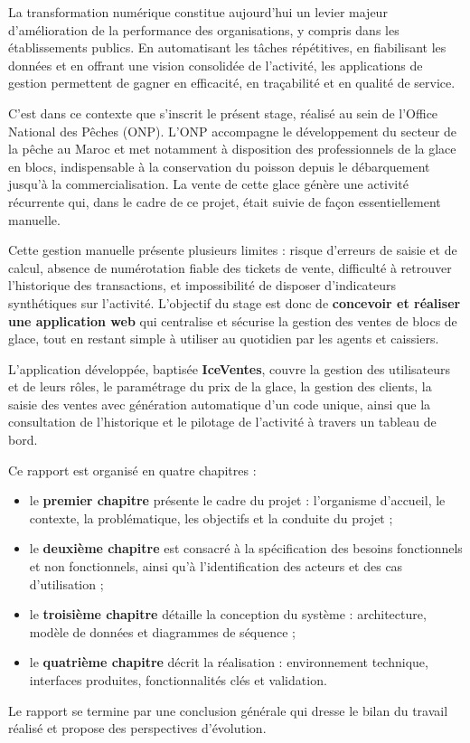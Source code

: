 La transformation numérique constitue aujourd'hui un levier majeur d'amélioration de la performance des organisations, y compris dans les établissements publics. En automatisant les tâches répétitives, en fiabilisant les données et en offrant une vision consolidée de l'activité, les applications de gestion permettent de gagner en efficacité, en traçabilité et en qualité de service.

C'est dans ce contexte que s'inscrit le présent stage, réalisé au sein de l'Office National des Pêches (ONP). L'ONP accompagne le développement du secteur de la pêche au Maroc et met notamment à disposition des professionnels de la glace en blocs, indispensable à la conservation du poisson depuis le débarquement jusqu'à la commercialisation. La vente de cette glace génère une activité récurrente qui, dans le cadre de ce projet, était suivie de façon essentiellement manuelle.

Cette gestion manuelle présente plusieurs limites : risque d'erreurs de saisie et de calcul, absence de numérotation fiable des tickets de vente, difficulté à retrouver l'historique des transactions, et impossibilité de disposer d'indicateurs synthétiques sur l'activité. L'objectif du stage est donc de \textbf{concevoir et réaliser une application web} qui centralise et sécurise la gestion des ventes de blocs de glace, tout en restant simple à utiliser au quotidien par les agents et caissiers.

L'application développée, baptisée \textbf{IceVentes}, couvre la gestion des utilisateurs et de leurs rôles, le paramétrage du prix de la glace, la gestion des clients, la saisie des ventes avec génération automatique d'un code unique, ainsi que la consultation de l'historique et le pilotage de l'activité à travers un tableau de bord.

Ce rapport est organisé en quatre chapitres :

\begin{itemize}
  \item le \textbf{premier chapitre} présente le cadre du projet : l'organisme d'accueil, le contexte, la problématique, les objectifs et la conduite du projet ;
  \item le \textbf{deuxième chapitre} est consacré à la spécification des besoins fonctionnels et non fonctionnels, ainsi qu'à l'identification des acteurs et des cas d'utilisation ;
  \item le \textbf{troisième chapitre} détaille la conception du système : architecture, modèle de données et diagrammes de séquence ;
  \item le \textbf{quatrième chapitre} décrit la réalisation : environnement technique, interfaces produites, fonctionnalités clés et validation.
\end{itemize}

Le rapport se termine par une conclusion générale qui dresse le bilan du travail réalisé et propose des perspectives d'évolution.
